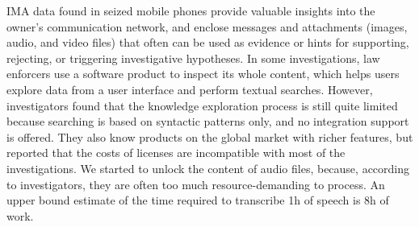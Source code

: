  





IMA data found in seized mobile phones 
provide valuable insights into the owner's communication network, and enclose messages and attachments (images, audio, and video files) that often can be used as evidence or hints for supporting, rejecting, or triggering investigative hypotheses. 
In some investigations, law enforcers 
use a software product to inspect its whole content, which helps users explore data from a user interface and perform textual searches. However, investigators found that the knowledge exploration process is still quite limited because searching is based on syntactic patterns only, and no integration support is offered. They also know products on the global market with richer features, 
but reported that the costs of licenses are incompatible with most of the investigations.    
We started to unlock the content of audio files, because, according to investigators, they are often too much resource-demanding to process. An upper bound estimate of the time required to transcribe 1h of speech is 8h of work.%




